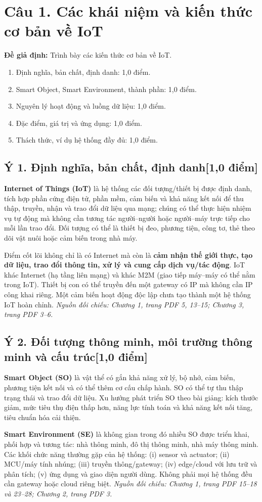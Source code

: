 \documentclass[12pt,a4paper]{article}
\newcommand{\muc}[1]{\subsection*{#1\hfill{\color{teal}\normalsize [1,0 điểm]}}}
\newcommand{\nguon}[1]{{\small\itshape\color{navy}Nguồn đối chiếu: #1.}}
\begin{document}
\section{Câu 1. Các khái niệm và kiến thức cơ bản về IoT}
\textbf{Đề giả định:} Trình bày các kiến thức cơ bản về IoT.
\begin{barem}
\begin{enumerate}
\item Định nghĩa, bản chất, định danh: 1,0 điểm.
\item Smart Object, Smart Environment, thành phần: 1,0 điểm.
\item Nguyên lý hoạt động và luồng dữ liệu: 1,0 điểm.
\item Đặc điểm, giá trị và ứng dụng: 1,0 điểm.
\item Thách thức, ví dụ hệ thống đầy đủ: 1,0 điểm.
\end{enumerate}
\end{barem}
\muc{Ý 1. Định nghĩa, bản chất, định danh}
\textbf{Internet of Things (IoT)} là hệ thống các đối tượng/thiết bị được định danh, tích hợp phần cứng điện tử, phần mềm, cảm biến và khả năng kết nối để thu thập, truyền, nhận và trao đổi dữ liệu qua mạng; chúng có thể thực hiện nhiệm vụ tự động mà không cần tương tác người--người hoặc người--máy trực tiếp cho mỗi lần trao đổi. Đối tượng có thể là thiết bị đeo, phương tiện, công tơ, thẻ theo dõi vật nuôi hoặc cảm biến trong nhà máy.

Điểm cốt lõi không chỉ là có Internet mà còn là \textbf{cảm nhận thế giới thực, tạo dữ liệu, trao đổi thông tin, xử lý và cung cấp dịch vụ/tác động}. IoT khác Internet (hạ tầng liên mạng) và khác M2M (giao tiếp máy--máy có thể nằm trong IoT). Thiết bị con có thể truyền đến một gateway có IP mà không cần IP công khai riêng. Một cảm biến hoạt động độc lập chưa tạo thành một hệ thống IoT hoàn chỉnh. \nguon{Chương 1, trang PDF 5, 13--15; Chương 3, trang PDF 3--6}

\muc{Ý 2. Đối tượng thông minh, môi trường thông minh và cấu trúc}
\textbf{Smart Object (SO)} là vật thể có gắn khả năng xử lý, bộ nhớ, cảm biến, phương tiện kết nối và có thể thêm cơ cấu chấp hành. SO có thể tự thu thập trạng thái và trao đổi dữ liệu. Xu hướng phát triển SO theo bài giảng: kích thước giảm, mức tiêu thụ điện thấp hơn, năng lực tính toán và khả năng kết nối tăng, tiêu chuẩn hóa cải thiện.

\textbf{Smart Environment (SE)} là không gian trong đó nhiều SO được triển khai, phối hợp và tương tác: nhà thông minh, đô thị thông minh, nhà máy thông minh. Các khối chức năng thường gặp của hệ thống: (i) sensor và actuator; (ii) MCU/máy tính nhúng; (iii) truyền thông/gateway; (iv) edge/cloud với lưu trữ và phân tích; (v) ứng dụng và giao diện người dùng. Không phải mọi hệ thống đều cần gateway hoặc cloud riêng biệt. \nguon{Chương 1, trang PDF 15--18 và 23--28; Chương 2, trang PDF 3}
\end{document}
